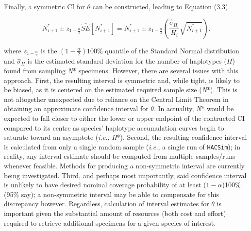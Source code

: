 Finally, a symmetric CI for $\theta$ can be constructed, leading to Equation (3.3)

\begin{equation}
N^*_{i+1} \pm z_{1-\frac{\alpha}{2}}\widehat{SE}[N^*_{i+1}] = N^*_{i+1} \pm z_{1-\frac{\alpha}{2}}\left(\frac{\hat{\sigma}_{H_i}}{H_i}\sqrt{N^*_{i+1}}\right).
\end{equation}

\noindent where $z_{1-\frac{\alpha}{2}}$ is the $(1-\frac{\alpha}{2})100\%$ quantile of the Standard Normal distribution and $\hat{\sigma}_{H}$ is the estimated standard deviation for the number of haplotypes ($H$) found from sampling \textit{N}* specimens.  However, there are several issues with this approach. First, the resulting interval is symmetric and, while tight, is likely to be biased, as it is centered on the estimated required sample size (\textit{N}*). This is not altogether unexpected due to reliance on the Central Limit Theorem in obtaining an approximate confidence interval for $\theta$. In actuality, \textit{N}* would be expected to fall closer to either the lower or upper endpoint of the contructed CI compared to its centre as species' haplotype accumulation curves begin to saturate toward an asymptote (\textit{i.e.}, \textit{H}*). Second, the resulting confidence interval is calculated from only a single random sample (\textit{i.e.}, a single run of {\tt HACSim}); in reality, any interval estimate should be computed from multiple samples/runs whenever feasible. Methods for producing a non-symmetric interval are currently being investigated. Third, and perhaps most importantly, said confidence interval is unlikely to have desired nominal coverage probability of at least 
($1 - \alpha$)100\% (95\% say); a non-symmetric interval may be able to compensate for this discrepancy however. Regardless, calculation of interval estimates for $\theta$ is important given the substantial amount of resources (both cost and effort) required to retrieve additional specimens for a given species of interest.


